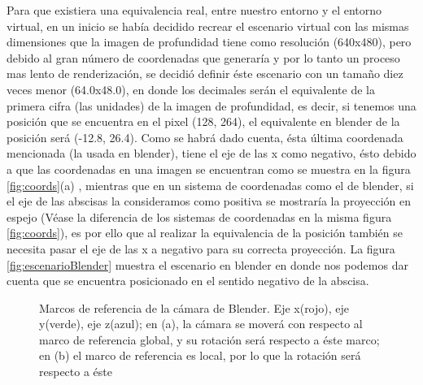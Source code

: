 \documentclass[a4paper,openright,12pt]{report}
\begin{document}
Para que existiera una equivalencia real, entre nuestro entorno y el entorno virtual, en un inicio se había decidido recrear el escenario virtual con las mismas dimensiones que la imagen de profundidad tiene como resolución (640x480), pero debido al gran número de coordenadas que generaría y por lo tanto un proceso mas lento de renderización, se decidió definir éste escenario con un tamaño diez veces menor (64.0x48.0), en donde los decimales serán el equivalente de la primera cifra (las unidades) de la imagen de profundidad, es decir, si tenemos una posición que se encuentra en el pixel (128, 264), el equivalente en blender de la posición será (-12.8, 26.4). Como se habrá dado cuenta, ésta última coordenada mencionada (la usada en blender), tiene el eje de las x como negativo, ésto debido a que las coordenadas en una imagen se encuentran como se muestra en la figura  \ref{fig:coords}(a) , mientras que en un sistema de coordenadas como el de blender, si el eje de las abscisas la consideramos como positiva se mostraría la proyección en espejo (Véase la diferencia de los sistemas de coordenadas en la misma figura \ref{fig:coords}), es por ello que al realizar la equivalencia de la posición también se necesita pasar el eje de las x a negativo para su correcta proyección. La figura \ref{fig:escenarioBlender} muestra el escenario en blender en donde nos podemos dar cuenta que se encuentra posicionado en el sentido negativo de la abscisa.\\
\begin{figure}[p]
	\centering
	\hspace*{-5mm}
	\hspace*{-5mm}
	\caption[Marcos de referencia de la cámara de Blender]{Marcos de referencia de la cámara de Blender. Eje x(rojo), eje y(verde), eje z(azul); en (a), la cámara se moverá con respecto al marco de referencia global, y su rotación será respecto a éste marco; en (b) el marco de referencia es local, por lo que la rotación será respecto a éste} \label{fig:camaraBlender}
\end{figure}
\end{document}
